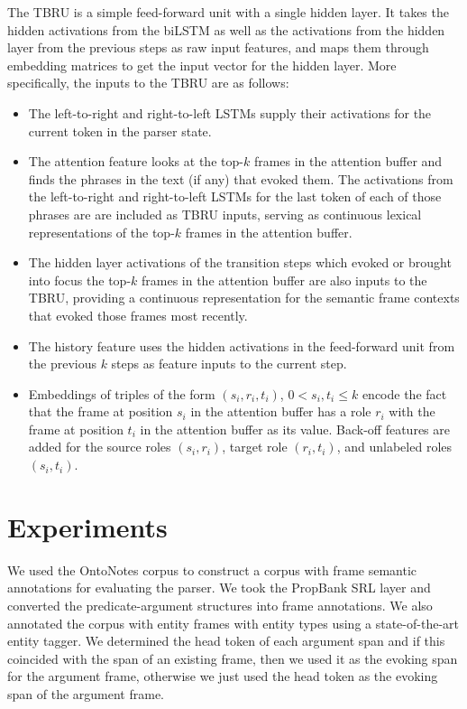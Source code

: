 \documentclass[11pt,a4paper]{article}
\begin{document}
The TBRU is a simple feed-forward unit with a single hidden layer.
It takes the hidden activations from the biLSTM as well as the activations from
the hidden layer from the previous steps as raw input features, and maps them
through embedding matrices to get the input vector for the  hidden layer. More specifically,
the inputs to the TBRU are as follows:

\begin{itemize}
  \item The left-to-right and right-to-left LSTMs supply their activations
  for the current token in the parser state.
  \item The attention feature looks at the top-$k$ frames in the attention buffer
  and finds the phrases in the text (if any) that evoked them. The activations
  from the left-to-right and right-to-left LSTMs for the last token of each of those
  phrases are are included as TBRU inputs, serving as continuous lexical
  representations of the top-$k$ frames in the attention buffer.
  \item The hidden layer activations of the transition steps which evoked or
  brought into focus the top-$k$ frames in the attention buffer are also inputs to the TBRU,
  providing a
  continuous representation for the semantic frame contexts that evoked those frames most recently.
  \item The history feature uses the hidden activations in the feed-forward
  unit from the previous $k$ steps as feature inputs to the current step.
  \item Embeddings of triples of the form $(s_i, r_i, t_i)$, $0<s_i,t_i\le k$ encode the fact that the frame at position $s_i$ in the attention buffer has a role $r_i$ with
  the frame at position $t_i$ in the attention buffer as its value. Back-off
  features are added for the source roles $(s_i,r_i)$, target role $(r_i, t_i)$,
  and unlabeled roles $(s_i,t_i)$. 
\end{itemize}

\section{Experiments}

We used the OntoNotes corpus \cite{ontonotes2006} to construct a corpus
with frame semantic annotations for evaluating the parser. We took the
PropBank SRL layer \cite{palmer2005} and converted the predicate-argument
structures into frame annotations. We also annotated the corpus with
entity frames with entity types using a state-of-the-art entity tagger.
We determined the head token of each argument span and if this coincided
with the span of an existing frame, then we used it as the evoking span for the
argument frame, otherwise we just used the head token as the evoking span of the
argument frame.
\end{document}
